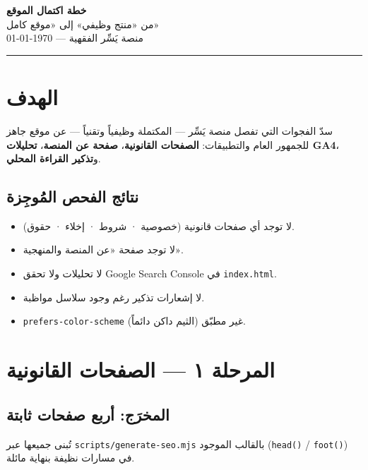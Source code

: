 \documentclass[11pt]{article}
\begin{document}
\begin{center}
  {\Huge\bfseries\color{gold} خطة اكتمال الموقع}\\[4pt]
  {\large\color{darkbg} من «منتج وظيفي» إلى «موقع كامل»}\\[6pt]
  {\small\color{midgray} منصة يَسِّر الفقهية — \today}
\end{center}

\vspace{4pt}
\hrule
\vspace{10pt}

\section{الهدف}

\begin{goalbox}
سدّ الفجوات التي تفصل منصة يَسِّر — المكتملة وظيفياً وتقنياً — عن موقع جاهز
للجمهور العام والتطبيقات: \textbf{الصفحات القانونية}، \textbf{صفحة عن المنصة}،
\textbf{تحليلات GA4}، و\textbf{تذكير القراءة المحلي}.
\end{goalbox}

\subsection*{نتائج الفحص المُوجِزة}
\begin{itemize}
  \item لا توجد أي صفحات قانونية (خصوصية · شروط · إخلاء · حقوق).
  \item لا توجد صفحة «عن المنصة والمنهجية».
  \item لا تحليلات ولا تحقق Google Search Console في \texttt{index.html}.
  \item لا إشعارات تذكير رغم وجود سلاسل مواظبة.
  \item \texttt{prefers-color-scheme} غير مطبّق (الثيم داكن دائماً).
\end{itemize}

\section{المرحلة ١ — الصفحات القانونية}

\subsection*{المخرَج: أربع صفحات ثابتة}
تُبنى جميعها عبر \texttt{scripts/generate-seo.mjs} بالقالب الموجود (\texttt{head()} / \texttt{foot()})
في مسارات نظيفة بنهاية مائلة.
\end{document}
